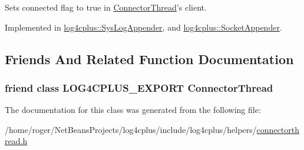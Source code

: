 Sets connected flag to true in \hyperlink{classlog4cplus_1_1helpers_1_1ConnectorThread}{Connector\-Thread}'s client. 



Implemented in \hyperlink{classlog4cplus_1_1SysLogAppender_a07d0db02cc101a9eaeaf82a2ef0848d1}{log4cplus\-::\-Sys\-Log\-Appender}, and \hyperlink{classlog4cplus_1_1SocketAppender_aa561aab2c474fe07dbcd8ba2fcf8fe5d}{log4cplus\-::\-Socket\-Appender}.



\subsection{Friends And Related Function Documentation}
\hypertarget{classlog4cplus_1_1helpers_1_1IConnectorThreadClient_a247bcb3fd9a6d838270c90b3a0b9001f}{
\subsubsection[{Connector\-Thread}]{\setlength{\rightskip}{0pt plus 5cm}friend class {\bf L\-O\-G4\-C\-P\-L\-U\-S\-\_\-\-E\-X\-P\-O\-R\-T} {\bf Connector\-Thread}\hspace{0.3cm}{\ttfamily [friend]}}}\label{classlog4cplus_1_1helpers_1_1IConnectorThreadClient_a247bcb3fd9a6d838270c90b3a0b9001f}


The documentation for this class was generated from the following file\-:\begin{DoxyCompactItemize}
\item 
/home/roger/\-Net\-Beans\-Projects/log4cplus/include/log4cplus/helpers/\hyperlink{connectorthread_8h}{connectorthread.\-h}\end{DoxyCompactItemize}

